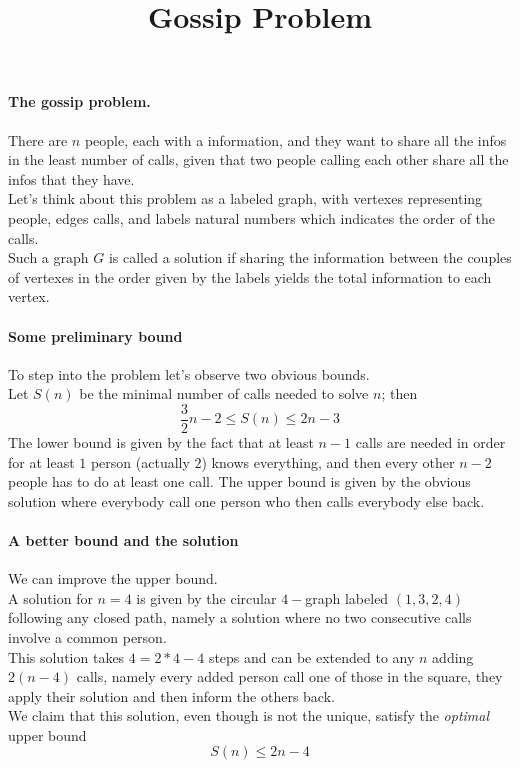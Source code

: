 \documentclass{article}
\title{Gossip Problem}
\begin{document}
\paragraph{The gossip problem.\\}
There are $n$ people, each with a information, and they want to share all the infos in the least number of calls, given that two people calling each other share all the infos that they have.\\
Let's think about this problem as a labeled graph, with vertexes representing people, edges calls, and labels natural numbers which indicates the order of the calls.\\
Such a graph $G$ is called a solution if sharing the information between the couples of vertexes in the order given by the labels yields the total information to each vertex.
\paragraph{Some preliminary bound\\}
To step into the problem let's observe two obvious bounds.\\
Let $S(n)$ be the minimal number of calls needed to solve $n$; then
\begin{equation*}
\frac{3}{2}n-2\leq S(n)\leq 2n-3
\end{equation*}
The lower bound is given by the fact that at least $n-1$ calls are needed in order for at least $1$ person (actually $2$) knows everything, and then every other $n-2$ people has to do at least one call. The upper bound is given by the obvious solution where everybody call one person who then calls everybody else back.
\paragraph{A better bound and the solution\\}
We can improve the upper bound.\\
A solution for $n=4$ is given by the circular $4-$graph labeled $(1,3,2,4)$ following any closed path, namely a solution where no two consecutive calls involve a common person.\\
This solution takes $4=2*4-4$ steps and can be extended to any $n$ adding $2(n-4)$ calls, namely every added person call one of those in the square, they apply their solution and then inform the others back.\\
We claim that this solution, even though is not the unique, satisfy the \emph{optimal} upper bound \begin{equation*}
S(n)\leq 2n-4
\end{equation*}
\end{document}
